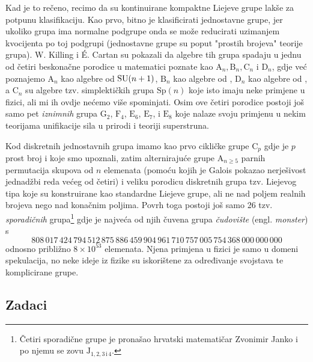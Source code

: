 Kad je to rečeno, recimo da su kontinuirane kompaktne Liejeve grupe
lakše za potpunu klasifikaciju. Kao prvo,
bitno je klasificirati jednostavne grupe, jer ukoliko grupa ima normalne
podgrupe onda se može reducirati uzimanjem kvocijenta po toj podgrupi
(jednostavne grupe su poput "prostih brojeva" teorije grupa). W. Killing i \'{E}. Cartan
  
su pokazali da algebre tih grupa spadaju u jednu od četiri beskonačne 
porodice u matematici poznate kao $\mathrm{A}_n, \mathrm{B}_n, \mathrm{C}_n$
i $\mathrm{D}_n$, gdje već poznajemo
$\mathrm{A}_n$ kao algebre od $\mathrm{SU}(n+1)$,  $\mathrm{B}_n$ kao algebre od ,
$\mathrm{D}_n$ kao algebre od , a $\mathrm{C}_n$ su algebre tzv. simplektičkih grupa
$\mathrm{Sp}(n)$ koje isto imaju neke primjene u fizici, ali mi ih ovdje
nećemo više spominjati. Osim ove četiri porodice postoji još samo
pet \emph{iznimnih} grupa $\mathrm{G}_2$, $\mathrm{F}_4$,
$\mathrm{E}_6$, $\mathrm{E}_7$, i $\mathrm{E}_8$ koje nalaze svoju primjenu
u nekim teorijama unifikacije sila u prirodi i teoriji superstruna.

Kod diskretnih jednostavnih grupa imamo kao prvo cikličke grupe $\mathrm{C}_{p}$
gdje je $p$ prost broj i koje smo upoznali, 
zatim alternirajuće grupe $\mathrm{A}_{n\ge 5}$ parnih permutacija skupova
od $n$ elemenata (pomoću kojih je Galois pokazao nerješivost jednadžbi
reda većeg od četiri) i
veliku porodicu diskretnih grupa tzv. Liejevog tipa koje su konstruirane
kao standardne Liejeve grupe, ali ne nad poljem realnih brojeva nego
nad konačnim poljima. Povrh toga postoji još samo 26 tzv. \emph{sporadičnih}
 
grupa\footnote{Četiri sporadične grupe je pronašao hrvatski matematičar Zvonimir Janko
i po njemu se zovu $\mathrm{J}_{1, 2, 3\,\mathrm{i}\, 4}$.} gdje je najveća od njih
čuvena grupa \emph{čudovište} (engl. \emph{monster}) s
\[ \textstyle
808\,017\,424\,794\,512\,875\,886\,459\,904\,961\,710\,757\,005\,754\,368\,000\,000\,000
\]
odnosno približno $8\times 10^{53}$ elemenata. Njena primjena u fizici je samo u domeni spekulacija, no
neke ideje iz fizike su iskorištene za određivanje svojstava te komplicirane
grupe.




\subsection*{Zadaci}

